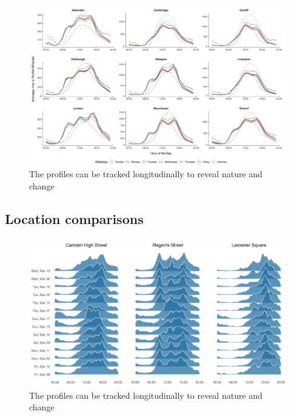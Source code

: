 \lipsum[1]

\begin{figure}
  \includegraphics[trim={0 10 0 0},clip]{images/applications-city-profiles.png}
  \caption{The profiles can be tracked longitudinally to reveal nature and change}
  \label{}
\end{figure}

\lipsum[1]

\subsection{Location comparisons}
\lipsum[1]

\begin{figure}
  \includegraphics[trim={0 10 0 0},clip]{images/applications-location-profiles.png}
  \caption{The profiles can be tracked longitudinally to reveal nature and change}
  \label{}
\end{figure}

